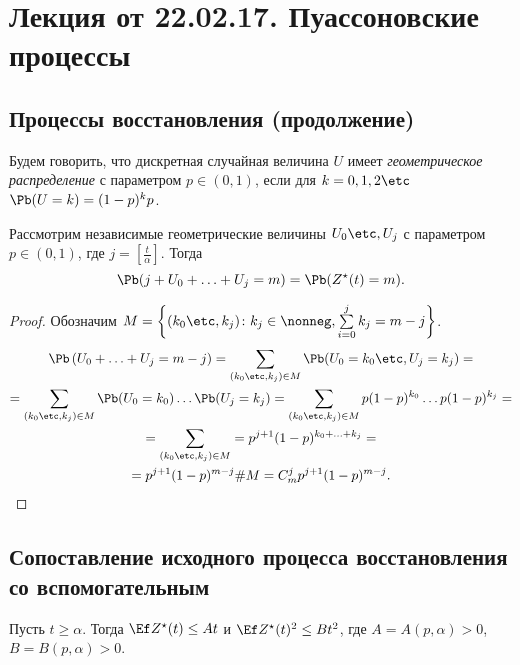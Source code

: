 




\section{Лекция от 22.02.17.
Пуассоновские процессы}


\subsection{Процессы восстановления (продолжение)}

\begin{df}
	Будем говорить, что дискретная случайная величина $U$ имеет \textit{геометрическое распределение} с параметром $p \in (0, 1)$, если для $k = 0, 1, 2\etc$ $\Pb(U = k) = (1-p)^{k}p$.
\end{df}

\begin{lemma}\label{lemsum}
	\sloppy
	Рассмотрим независимые геометрические величины $U_{0}\etc , U_{j}$ с параметром $p \in (0, 1)$, где $j = \left[ \frac{t}{\alpha} \right]$.
Тогда
	$$
		\Pb (j + U_{0} + \ldots + U_{j} = m) = \Pb (Z^{\star}(t) = m ).
	$$
\end{lemma}

\begin{proof}
	 Обозначим $M = \left\{ (k_0\etc, k_j)\colon k_j \in \nonneg, \sum\limits_{i = 0}^j k_j = m - j\right\}$.
	\begin{multline*}
		\Pb\left( U_0 + \ldots + U_j = m - j\right) = \sum_{(k_0\etc, k_j) \in M} \Pb(U_0 = k_0\etc, U_j = k_j) =\\
		= \sum_{(k_0\etc, k_j) \in M} \Pb(U_0 = k_0)\ldots \Pb(U_j = k_j) = \sum_{(k_0\etc, k_j) \in M} p (1 - p)^{k_0}\ldots p (1 - p)^{k_j} =\\
		= \sum_{(k_0\etc, k_j) \in M} = p^{j + 1} (1 - p)^{k_0 + \ldots + k_j} =\\
		= p^{j + 1} (1 - p)^{m - j} \#M = C_m^j p^{j + 1} (1 - p)^{m - j}.
	\end{multline*}
\end{proof}

\subsection{Сопоставление исходного процесса восстановления со вспомогательным}

\begin{lemma}\label{est}
	Пусть $t \ge \alpha$.
Тогда $\Ef Z^\star(t) \le At$ и $\Ef Z^\star(t)^2 \le B t^2$, где $A = A(p, \alpha) > 0$, $B = B(p, \alpha) > 0$.
\end{lemma}

